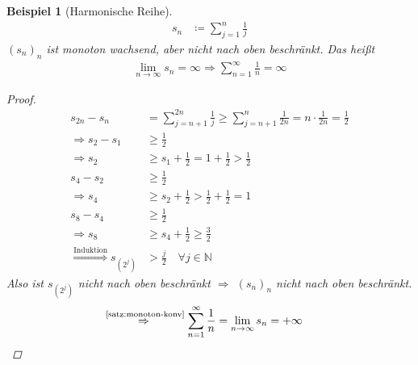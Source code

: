 \documentclass[11pt, twoside, a4paper]{article}
\theoremstyle{plain}
\newtheorem{beispiel}[blockelement]{Beispiel}
\newcommand{\pair}[1]{\left(#1\right)}
\newcommand{\impl}[0]{\Rightarrow{}}
\newcommand{\fromto}{\rightarrow{}}
\newcommand{\definedas}[0]{\coloneqq}
\newcommand{\annot}[3][]{\overset{\text{#3}}#1{#2}}
\newcommand{\N}{\mathbb{N}}
\begin{document}
    \begin{beispiel}[Harmonische Reihe]
        \begin{align*}
            s_n &\definedas \sum_{j=1}^{n} \frac{1}{j}
        \end{align*}
        $(s_n)_n$ ist monoton wachsend, aber nicht nach oben beschränkt. Das heißt
        \begin{align*}
            \lim_{n\fromto\infty} s_n = \infty \impl \sum_{n=1}^{\infty} \frac{1}{n} = \infty
        \end{align*}

        \newpage

        \begin{proof}
            \begin{align*}
                s_{2n} - s_n &= \sum_{j=n+1}^{2n} \frac{1}{j} \geq \sum_{j=n+1}^{n} \frac{1}{2n} = n \cdot\frac{1}{2n} = \frac{1}{2}\\
                \impl s_2 - s_1 &\geq \frac{1}{2}\\
                \impl s_2 &\geq s_1 + \frac{1}{2} = 1 + \frac{1}{2} > \frac{1}{2}\\
                s_4 - s_2 &\geq \frac{1}{2}\\
                \impl s_4 &\geq s_2 + \frac{1}{2} > \frac{1}{2} + \frac{1}{2} = 1\\
                s_8 - s_4 &\geq \frac{1}{2}\\
                \impl s_8 &\geq s_4 + \frac{1}{2} \geq \frac{3}{2}\\
                \annot{\impl}{Induktion} s_{\pair{2^j}} &> \frac{j}{2}\quad\forall j\in\N
            \end{align*}
            \noindent Also ist $s_{\pair{2^j}}$ nicht nach oben beschränkt $\impl$ $(s_n)_n$ nicht nach oben beschränkt.
            \begin{align*}
                \annot{\impl}{\ref{satz:monoton-konv}} \sum_{n=1}^{\infty} \frac{1}{n} = \lim_{n\fromto\infty} s_n &= +\infty\qedhere
            \end{align*}
        \end{proof}
    \end{beispiel}
\end{document}
